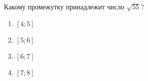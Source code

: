  
\begin{ex}
	Какому промежутку принадлежит число $\sqrt{55}$?
	
	\selectanswer
	\begin{multicols}{4}
		\begin{enumerate}[label=\arabic*)]
			\item $[4;5]$
			\item $[5;6]$
			\item $[6;7]$
			\item $[7;8]$
		\end{enumerate}
	\end{multicols}
\end{ex}
